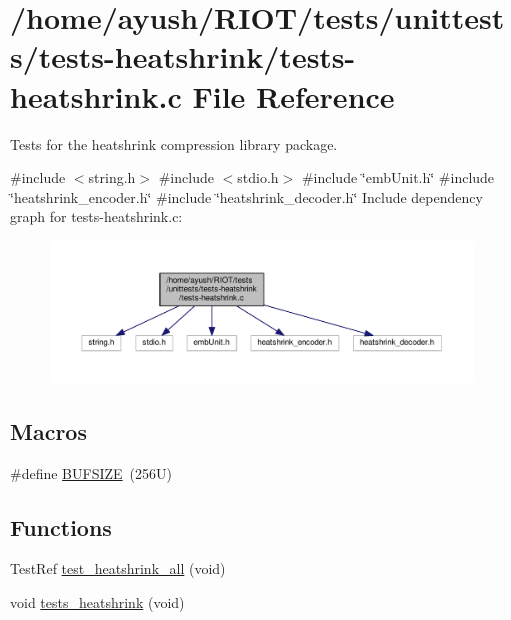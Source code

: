 \hypertarget{tests-heatshrink_8c}{}\section{/home/ayush/\+R\+I\+O\+T/tests/unittests/tests-\/heatshrink/tests-\/heatshrink.c File Reference}
\label{tests-heatshrink_8c}


Tests for the heatshrink compression library package.  


{\ttfamily \#include $<$string.\+h$>$}\newline
{\ttfamily \#include $<$stdio.\+h$>$}\newline
{\ttfamily \#include \char`\"{}emb\+Unit.\+h\char`\"{}}\newline
{\ttfamily \#include \char`\"{}heatshrink\+\_\+encoder.\+h\char`\"{}}\newline
{\ttfamily \#include \char`\"{}heatshrink\+\_\+decoder.\+h\char`\"{}}\newline
Include dependency graph for tests-\/heatshrink.c\+:
\nopagebreak
\begin{figure}[H]
\begin{center}
\leavevmode
\includegraphics[width=350pt]{tests-heatshrink_8c__incl}
\end{center}
\end{figure}
\subsection*{Macros}
\begin{DoxyCompactItemize}
\item 
\#define \hyperlink{tests-heatshrink_8c_aeca034f67218340ecb2261a22c2f3dcd}{B\+U\+F\+S\+I\+ZE}~(256\+U)
\end{DoxyCompactItemize}
\subsection*{Functions}
\begin{DoxyCompactItemize}
\item 
Test\+Ref \hyperlink{tests-heatshrink_8c_ab5b9c302d03ce463b667fdca371b9969}{test\+\_\+heatshrink\+\_\+all} (void)
\item 
void \hyperlink{tests-heatshrink_8c_a29eabd0b9fb6ebb88a9b28bff9d36234}{tests\+\_\+heatshrink} (void)
\end{DoxyCompactItemize}


